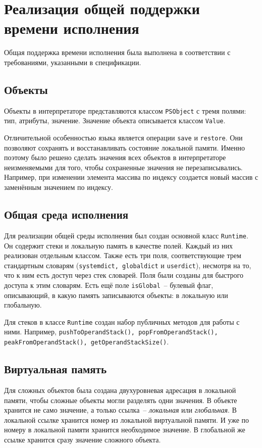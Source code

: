 \section{Реализация общей поддержки времени исполнения}
Общая поддержка времени исполнения была выполнена в соответствии с требованиями, указанными в спецификации.

\subsection{Объекты}
Объекты в интерпретаторе представляются классом \texttt{PSObject} с тремя полями: тип, атрибуты, значение. Значение объекта описывается классом \texttt{Value}.

Отличительной особенностью языка является операции \texttt{save} и \texttt{restore}. Они позволяют сохранять и восстанавливать состояние локальной памяти. Именно поэтому было решено сделать значения всех объектов в интерпретаторе неизменяемыми для того, чтобы сохраненные значения не перезаписывались. Например, при изменении элемента массива по индексу создается новый массив с заменённым значением по индексу.

\subsection{Общая среда исполнения}
Для реализации общей среды исполнения был создан основной класс \texttt{Runtime}. Он содержит стеки и локальную память в качестве полей. Каждый из них реализован отдельным классом. Также есть три поля, соответствующие трем стандартным словарям (\texttt{systemdict, globaldict} и \texttt{userdict}), несмотря на то, что к ним есть доступ через стек словарей. Поля были созданы для быстрого доступа к этим словарям. Есть ещё поле \texttt{isGlobal}~-- булевый флаг, описывающий, в какую память записываются объекты: в локальную или глобальную.

Для стеков в классе \texttt{Runtime} создан набор публичных методов для работы с ними. Например, \texttt{pushToOperandStack(), popFromOperandStack(), peakFromOperandStack(), getOperandStackSize()}. 


\subsection{Виртуальная память}
Для сложных объектов была создана двухуровневая адресация в локальной памяти, чтобы сложные объекты могли разделять одни значения. В объекте хранится не само значение, а только ссылка~-- \textit{локальная} или \textit{глобальная}. В локальной ссылке хранится номер из локальной виртуальной памяти. И уже по номеру в локальной памяти хранится необходимое значение. В глобальной же ссылке хранится сразу значение сложного объекта.

